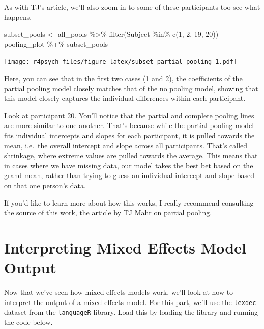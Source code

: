 \documentclass[
]{book}
\newenvironment{Shaded}{\begin{snugshade}}{\end{snugshade}}
\newcommand{\DecValTok}[1]{\textcolor[rgb]{0.00,0.00,0.81}{#1}}
\newcommand{\FunctionTok}[1]{\textcolor[rgb]{0.00,0.00,0.00}{#1}}
\newcommand{\NormalTok}[1]{#1}
\newcommand{\OtherTok}[1]{\textcolor[rgb]{0.56,0.35,0.01}{#1}}
\newcommand{\SpecialCharTok}[1]{\textcolor[rgb]{0.00,0.00,0.00}{#1}}
\begin{document}
As with TJ's article, we'll also zoom in to some of these participants too see what happens.

\begin{Shaded}
\begin{Highlighting}[]
\NormalTok{subset\_pools }\OtherTok{\textless{}{-}}\NormalTok{ all\_pools }\SpecialCharTok{\%\textgreater{}\%} \FunctionTok{filter}\NormalTok{(Subject }\SpecialCharTok{\%in\%} \FunctionTok{c}\NormalTok{(}\DecValTok{1}\NormalTok{, }\DecValTok{2}\NormalTok{, }\DecValTok{19}\NormalTok{, }\DecValTok{20}\NormalTok{))}
\NormalTok{pooling\_plot }\SpecialCharTok{\%+\%}\NormalTok{ subset\_pools}
\end{Highlighting}
\end{Shaded}

\texttt{[image: r4psych\_files/figure-latex/subset-partial-pooling-1.pdf]}

Here, you can see that in the first two cases (1 and 2), the coefficients of the partial pooling model closely matches that of the no pooling model, showing that this model closely captures the individual differences within each participant.

Look at participant 20. You'll notice that the partial and complete pooling lines are more similar to one another. That's because while the partial pooling model fits individual intercepts and slopes for each participant, it is pulled towards the mean, i.e.~the overall intercept and slope across all participants. That's called shrinkage, where extreme values are pulled towards the average. This means that in cases where we have missing data, our model takes the best bet based on the grand mean, rather than trying to guess an individual intercept and slope based on that one person's data.

If you'd like to learn more about how this works, I really recommend consulting the source of this work, the article by \href{https://tjmahr.github.io/plotting-partial-pooling-in-mixed-effects-models/}{TJ Mahr on partial pooling}.

\hypertarget{interpreting-mixed-effects-model-output}{%
\section{Interpreting Mixed Effects Model Output}\label{interpreting-mixed-effects-model-output}}

Now that we've seen how mixed effects models work, we'll look at how to interpret the output of a mixed effects model. For this part, we'll use the \texttt{lexdec} dataset from the \texttt{languageR} library. Load this by loading the library and running the code below.
\end{document}
